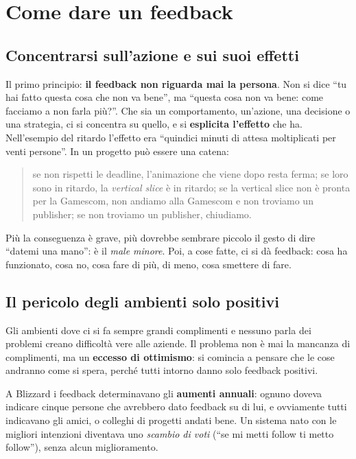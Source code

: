 \section{Come dare un feedback}
\label{sec:z1-dare}

\subsection{Concentrarsi sull'azione e sui suoi effetti}

Il primo principio: \textbf{il feedback non riguarda mai la persona}. Non si
dice ``tu hai fatto questa cosa che non va bene'', ma ``questa cosa non va
bene: come facciamo a non farla più?''. Che sia un comportamento, un'azione,
una decisione o una strategia, ci si concentra su quello, e si
\textbf{esplicita l'effetto} che ha. Nell'esempio del ritardo l'effetto era
``quindici minuti di attesa moltiplicati per venti persone''. In un progetto
può essere una catena:
\begin{quote}
  se non rispetti le deadline, l'animazione che viene dopo resta ferma; se
  loro sono in ritardo, la \emph{vertical slice} è in ritardo; se la vertical
  slice non è pronta per la Gamescom, non andiamo alla Gamescom e non troviamo
  un publisher; se non troviamo un publisher, chiudiamo.
\end{quote}
Più la conseguenza è grave, più dovrebbe sembrare piccolo il gesto di dire
``datemi una mano'': è il \emph{male minore}. Poi, a cose fatte, ci si dà
feedback: cosa ha funzionato, cosa no, cosa fare di più, di meno, cosa smettere
di fare.

\subsection{Il pericolo degli ambienti solo positivi}

Gli ambienti dove ci si fa sempre grandi complimenti e nessuno parla dei
problemi creano difficoltà vere alle aziende. Il problema non è mai la
mancanza di complimenti, ma un \textbf{eccesso di ottimismo}: si comincia a
pensare che le cose andranno come si spera, perché tutti intorno danno solo
feedback positivi.

A Blizzard i feedback determinavano gli \textbf{aumenti annuali}: ognuno
doveva indicare cinque persone che avrebbero dato feedback su di lui, e
ovviamente tutti indicavano gli amici, o colleghi di progetti andati bene. Un
sistema nato con le migliori intenzioni diventava uno \emph{scambio di voti}
(``se mi metti follow ti metto follow''), senza alcun miglioramento.


